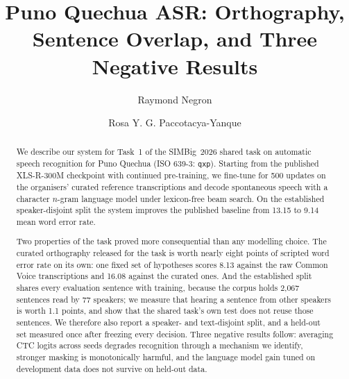\documentclass[runningheads]{llncs}
\begin{document}
\title{Puno Quechua ASR: Orthography, Sentence Overlap,
and Three Negative Results}


\author{Raymond Negron \and Rosa Y. G. Paccotacya-Yanque}


\maketitle

\begin{abstract}
We describe our system for Task~1 of the SIMBig~2026 shared task on automatic
speech recognition for Puno Quechua (ISO 639-3: \texttt{qxp}). Starting from the
published XLS-R-300M checkpoint with continued pre-training, we fine-tune for
500 updates on the organisers' curated reference transcriptions and decode
spontaneous speech with a character $n$-gram language model under lexicon-free
beam search. On the established speaker-disjoint split the system improves the
published baseline from 13.15 to 9.14 mean word error rate.

Two properties of the task proved more consequential than any modelling choice.
The curated orthography released for the task is worth nearly eight points of
scripted word error rate on its own: one fixed set of hypotheses scores 8.13
against the raw Common Voice transcriptions and 16.08 against the curated ones. And the established split shares every
evaluation sentence with training, because the corpus holds 2{,}067 sentences
read by 77 speakers; we measure that hearing a sentence from other speakers is
worth 1.1 points, and show that the shared task's own test does not reuse those
sentences. We therefore also report a speaker- and text-disjoint split, and a
held-out set measured once after freezing every decision. Three negative
results follow: averaging CTC logits across seeds degrades recognition through
a mechanism we identify, stronger masking is monotonically harmful, and the
language model gain tuned on development data does not survive on held-out data.

\end{abstract}
\end{document}
